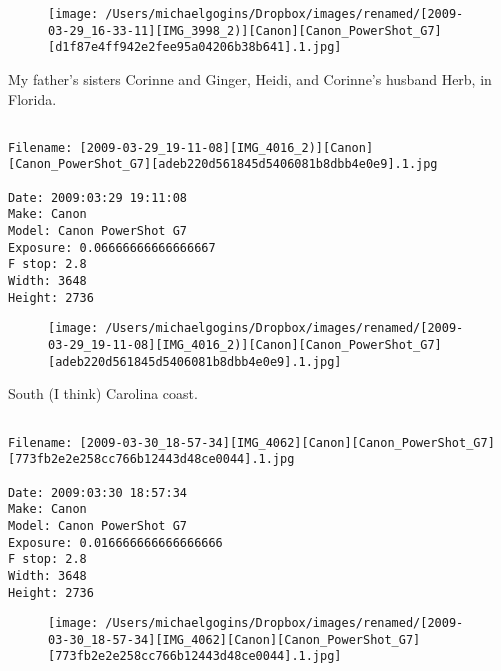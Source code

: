 \begin{figure}
\texttt{[image: /Users/michaelgogins/Dropbox/images/renamed/[2009-03-29\_16-33-11][IMG\_3998\_2)][Canon][Canon\_PowerShot\_G7][d1f87e4ff942e2fee95a04206b38b641].1.jpg]}
\end{figure}
    
\clearpage
\onecolumn
\noindent My father's sisters Corinne and Ginger, Heidi, and Corinne's husband Herb, in Florida.
\noindent
\begin{lstlisting}

Filename: [2009-03-29_19-11-08][IMG_4016_2)][Canon][Canon_PowerShot_G7][adeb220d561845d5406081b8dbb4e0e9].1.jpg

Date: 2009:03:29 19:11:08
Make: Canon
Model: Canon PowerShot G7
Exposure: 0.06666666666666667
F stop: 2.8
Width: 3648
Height: 2736
\end{lstlisting}
\clearpage

\begin{figure}
\texttt{[image: /Users/michaelgogins/Dropbox/images/renamed/[2009-03-29\_19-11-08][IMG\_4016\_2)][Canon][Canon\_PowerShot\_G7][adeb220d561845d5406081b8dbb4e0e9].1.jpg]}
\end{figure}
    
\clearpage
\onecolumn
\noindent South (I think) Carolina coast.
\noindent
\begin{lstlisting}

Filename: [2009-03-30_18-57-34][IMG_4062][Canon][Canon_PowerShot_G7][773fb2e2e258cc766b12443d48ce0044].1.jpg

Date: 2009:03:30 18:57:34
Make: Canon
Model: Canon PowerShot G7
Exposure: 0.016666666666666666
F stop: 2.8
Width: 3648
Height: 2736
\end{lstlisting}
\clearpage

\begin{figure}
\texttt{[image: /Users/michaelgogins/Dropbox/images/renamed/[2009-03-30\_18-57-34][IMG\_4062][Canon][Canon\_PowerShot\_G7][773fb2e2e258cc766b12443d48ce0044].1.jpg]}
\end{figure}
    
